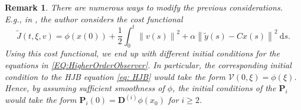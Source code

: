 \documentclass[11pt,reqno]{amsart}
\numberwithin{equation}{section}
\theoremstyle{plain}
\newtheorem{remark}{Remark}
\newcommand{\norm}[1]{\left\| #1 \right\|}
\newcommand{\TenDeriv}[1]{\mathbf{D}^{(#1)}}
\begin{document}
\begin{remark}
  There are numerous ways to modify the previous considerations.
      E.g., in \cite{Fle97}, the author considers the cost functional
      \[
        \tilde{J}(t,\xi,v) = \phi(x(0)) + \frac{1}{2}\int_{0}^{t}\norm{v(s)}^2 + \alpha\norm{\tilde{y}(s)-Cx(s)}^2~\mathrm{d} s.
      \]
      Using this cost functional, we end up with different initial conditions for the equations in \eqref{EQ:HigherOrderObserver}. In particular, the corresponding initial condition to the HJB equation \eqref{eq: HJB} would take the form $\mathcal{V}(0,\xi) = \phi(\xi)$. Hence, by assuming sufficient smoothness of $\phi$, the initial conditions of the $\mathbf{P}_i$ would take the form $\mathbf{P}_i(0) = \TenDeriv{i}\phi(x_0)$ for $i\ge 2$.
\end{remark}
\end{document}
